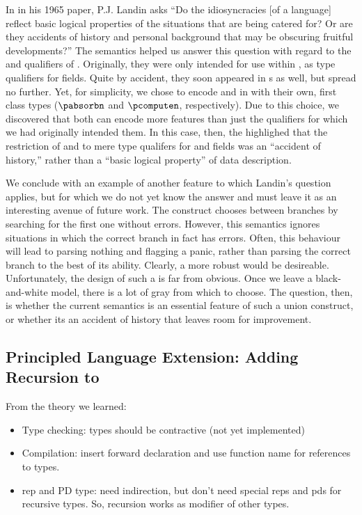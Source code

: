 In in his 1965 paper, P.J. Landin asks ``Do the idiosyncracies [of a
language] reflect basic logical properties of the situations that are
being catered for?  Or are they accidents of history and personal
background that may be obscuring fruitful developments?''  The
semantics helped us answer this question with regard to the \Pomit{}
and \Pcompute{} qualifiers of \pads{}.  Originally, they were only
intended for use within \Pstructs{}, as type qualifiers for fields.
Quite by accident, they soon appeared in \Punion{}s as well, but
spread no further. Yet, for simplicity, we chose to encode \Pomit{}
and \Pcompute{} in \ddc{} with their own, first class types
($\pabsorbn$ and $\pcomputen$, respectively). Due to this choice, we
discovered that both can encode more \pads{} features than just the
qualifiers for which we had originally intended them. In this case,
then, the \ddc{} highlighed that the restriction of \Pomit{} and
\Pcompute{} to mere type qualifers for \Punion{} and \Pstruct{} fields
was an ``accident of history,'' rather than a ``basic logical
property'' of data description.

We conclude with an example of another feature to which Landin's
question applies, but for which we do not yet know the answer and must
leave it as an interesting avenue of future work. The \Punion{}
construct chooses between branches by searching for the first one
without errors. However, this semantics ignores situations in which
the correct branch in fact has errors. Often, this behaviour will lead
to parsing nothing and flagging a panic, rather than parsing the
correct branch to the best of its ability. Clearly, a more robust
\Punion{} would be desireable. Unfortunately, the design of such a
\Punion{} is far from obvious. Once we leave a black-and-white model,
there is a lot of gray from which to choose. The question, then, is
whether the current semantics is an essential feature of such a union
construct, or whether its an accident of history that leaves room for
improvement.

\subsection{Principled Language Extension: Adding Recursion to \pads{}}

From the theory we learned:
\begin{itemize}
\item Type checking: types should be contractive (not yet implemented)
\item Compilation: insert forward declaration and use function name for
  references to types.
\item rep and PD type: need indirection, but don't need special reps
  and pds for recursive types. So, recursion works as modifier of
  other types.
\end{itemize}

